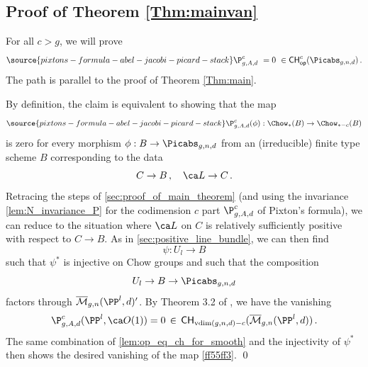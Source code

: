 \subsection{Proof of Theorem \ref{Thm:mainvan}}
For all $c>g$, we will prove
\begin{equation} \label{eqn:PgAdc_vanishing}
\source{pixtons-formula-abel-jacobi-picard-stack}
    \P_{g,A,d}^c\ = 0 \
\in {\mathsf{CH}}^c_{\mathsf{op}}(\Picabs_{g,n,d})\, .
\end{equation}
The path is parallel to the proof of Theorem \ref{Thm:main}.

By definition, the claim is
equivalent to showing that the map
\begin{equation}\label{ff55ff3}
\source{pixtons-formula-abel-jacobi-picard-stack}
 \P_{g,A,d}^c(\phi) : \Chow_*(B) \to \Chow_{*-c}(B)
 \end{equation}
is zero for every
morphism $\phi:B \to \Picabs_{g,n,d}$ from an (irreducible) finite type scheme $B$
corresponding to the data
$$C \to B\, , \ \ \  \ca L \to C\,.$$
Retracing the steps of \cref{sec:proof_of_main_theorem} (and using the invariance \cref{lem:N_invariance_P}  for the codimension $c$ part $\P_{g,A,d}^c$ of Pixton's formula), we can reduce to the situation where $\ca L$ on $C$ is relatively sufficiently
positive with respect to $C \to B$. As in \cref{sec:positive_line_bundle},
we can then find $$\psi: U_l \to B$$
such that $\psi^*$ is injective on Chow groups and such that the composition
$$U_l \to B \to \Picabs_{g,n,d}$$
factors through $\overline{\mathcal{M}}_{g,n}(\PP^l, d)'$. By Theorem 3.2
of \cite{Bae},
we have the vanishing $$\P_{g,A,d}^c (\PP^l,\ca O(1)) = 0
\, \in \, \mathsf{CH}_{\textup{vdim}(g,n,d)-c}(\overline{\mathcal{M}}_{g,n}(\PP^l, d))\, .$$
The same combination of \cref{lem:op_eq_ch_for_smooth} and the injectivity of $\psi^*$ then shows the desired vanishing of the map \eqref{ff55ff3}. \qed




